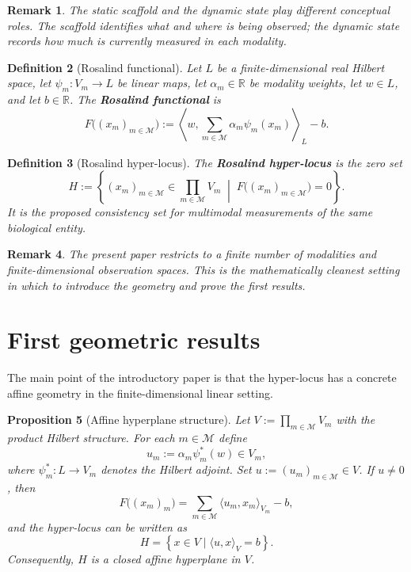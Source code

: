 \documentclass[11pt]{article}
\newtheorem{definition}{Definition}[section]
\newtheorem{proposition}[definition]{Proposition}
\newtheorem{remark}[definition]{Remark}
\begin{document}
\begin{remark}
The static scaffold and the dynamic state play different conceptual roles. The scaffold identifies \emph{what} and \emph{where} is being observed; the dynamic state records \emph{how much} is currently measured in each modality.
\end{remark}

\begin{definition}[Rosalind functional]
Let $L$ be a finite-dimensional real Hilbert space, let $\psi_m:V_m\to L$ be linear maps, let $\alpha_m\in\mathbb{R}$ be modality weights, let $w\in L$, and let $b\in\mathbb{R}$. The \textbf{Rosalind functional} is
\[
F\bigl((x_m)_{m\in\mathcal{M}}\bigr)
:=
\left\langle w, \sum_{m\in\mathcal{M}} \alpha_m\psi_m(x_m)\right\rangle_L - b.
\]
\end{definition}

\begin{definition}[Rosalind hyper-locus]
The \textbf{Rosalind hyper-locus} is the zero set
\[
H:=\left\{(x_m)_{m\in\mathcal{M}}\in\prod_{m\in\mathcal{M}}V_m\;\middle|\; F\bigl((x_m)_{m\in\mathcal{M}}\bigr)=0\right\}.
\]
It is the proposed consistency set for multimodal measurements of the same biological entity.
\end{definition}

\begin{remark}
The present paper restricts to a finite number of modalities and finite-dimensional observation spaces. This is the mathematically cleanest setting in which to introduce the geometry and prove the first results.
\end{remark}

\section{First geometric results}

The main point of the introductory paper is that the hyper-locus has a concrete affine geometry in the finite-dimensional linear setting.

\begin{proposition}[Affine hyperplane structure]\label{prop:affine-hyperplane}
Let $V:=\prod_{m\in\mathcal{M}}V_m$ with the product Hilbert structure. For each $m\in\mathcal{M}$ define
\[
u_m := \alpha_m\psi_m^*(w)\in V_m,
\]
where $\psi_m^*:L\to V_m$ denotes the Hilbert adjoint. Set $u:=(u_m)_{m\in\mathcal{M}}\in V$.
If $u\neq 0$, then
\[
F\bigl((x_m)_m\bigr)=\sum_{m\in\mathcal{M}}\langle u_m,x_m\rangle_{V_m}-b,
\]
and the hyper-locus can be written as
\[
H=\left\{x\in V\mid \langle u,x\rangle_V=b\right\}.
\]
Consequently, $H$ is a closed affine hyperplane in $V$.
\end{proposition}
\end{document}
